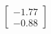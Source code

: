 \documentclass[preview]{standalone}
\begin{document}
\begin{align*}
\begin{bmatrix} -1.77 \\ -0.88 \end{bmatrix}
\end{align*}
\end{document}

